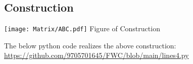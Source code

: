 \documentclass[10pt,a4paper]{report}
\begin{document}
\begin{multicols}{2}
 \section{Construction}
  \begin{center}
    \texttt{[image: Matrix/ABC.pdf]} 
     Figure of Construction
   \end{center}
   \vspace{10mm}
The below python code realizes the above construction: \\
\url{https://github.com/9705701645/FWC/blob/main/lines4.py}

     

\end{multicols}
\end{document}
